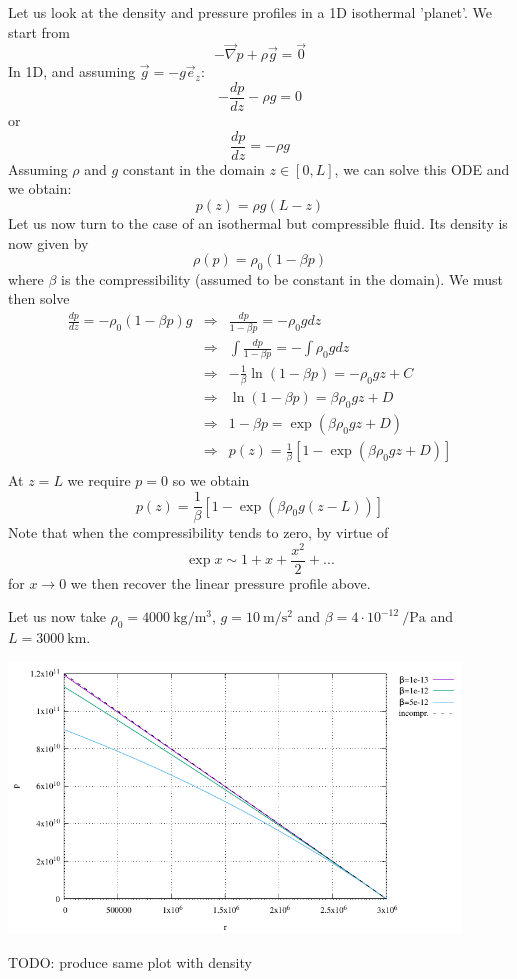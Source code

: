 Let us look at the density and pressure profiles in a 1D isothermal 'planet'. 
We start from 
\[
-\vec\nabla p + \rho \vec{g} = \vec{0}
\]
In 1D, and assuming $\vec{g}=-g \vec{e}_z$:
\[
-\frac{dp}{dz}-\rho g=0
\]
or
\[
\frac{dp}{dz}= -\rho g
\]
Assuming $\rho$ and $g$ constant in the domain $z\in [0,L]$, we can solve this ODE and we obtain:
\[
p(z) = \rho g (L-z)
\]
Let us now turn to the case of an isothermal but compressible fluid. 
Its density is now given by 
\[
\rho(p) = \rho_0(1-\beta p)
\]
where $\beta$ is the compressibility (assumed to be constant in the domain). We must then solve
\begin{eqnarray}
\frac{dp}{dz}= -\rho_0(1-\beta p) g
&\Rightarrow&
\frac{dp}{1-\beta p} = -\rho_0 g dz \nonumber\\
&\Rightarrow&
\int \frac{dp}{1-\beta p} = -\int \rho_0 g dz \nonumber\\
&\Rightarrow&
-\frac{1}{\beta} \ln (1-\beta p) = -\rho_0 g z + C \nonumber\\
&\Rightarrow&
\ln (1-\beta p) = \beta \rho_0 g z + D \nonumber\\
&\Rightarrow&
1 -\beta p = \exp \left( \beta \rho_0 g z + D  \right) \nonumber\\
&\Rightarrow&
p(z) = \frac{1}{\beta} \left[ 1- \exp \left( \beta \rho_0 g z + D  \right) \right] \nonumber\\
\end{eqnarray}
At $z=L$ we require $p=0$ so we obtain
\[
p(z) = \frac{1}{\beta} \left[ 1- \exp \left( \beta \rho_0 g (z-L)  \right) \right]
\]
Note that when the compressibility tends to zero, by virtue of 
\[
\exp x \sim 1 + x + \frac{x^2}{2} + ...
\]
for $x\rightarrow 0$ we then recover the linear pressure profile above.

Let us now take $\rho_0=\SI{4000}{\kg\per\cubic\meter}$, 
$g=\SI{10}{\meter\per\square\second}$ and $\beta=4\cdot 10^{-12}~\si{\per\pascal}$ \cite{gadb20} 
and $L=3000~\si{\km}$.

\begin{center}
\includegraphics[width=12cm]{images/density_profile/pressure}
\end{center}

TODO: produce same plot with density
